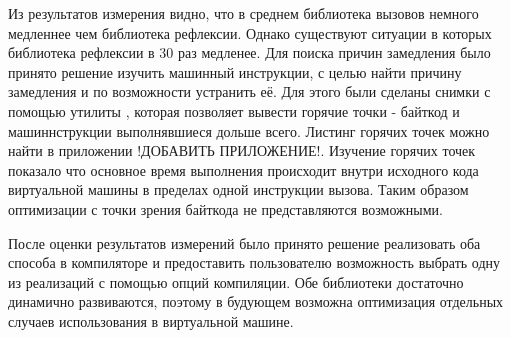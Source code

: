 Из результатов измерения видно, что в среднем библиотека вызовов немного медленнее чем библиотека рефлексии. Однако существуют ситуации в которых библиотека рефлексии в 30 раз медленее. Для поиска причин замедления было принято решение изучить машинный инструкции, с целью найти причину замедления и по возможности устранить её. Для этого были сделаны снимки с помощью утилиты , которая позволяет вывести горячие точки - байткод и машиннструкции выполнявшиеся дольше всего. Листинг горячих точек можно найти в приложении !ДОБАВИТЬ ПРИЛОЖЕНИЕ!. Изучение горячих точек показало что основное время выполнения происходит внутри исходного кода виртуальной машины в пределах одной инструкции вызова. Таким образом оптимизации с точки зрения байткода не представляются возможными.

После оценки результатов измерений было принято решение реализовать оба способа в компиляторе и предоставить пользователю возможность выбрать одну из реализаций с помощью опций компиляции. Обе библиотеки достаточно динамично развиваются, поэтому в будующем возможна оптимизация отдельных случаев использования в виртуальной машине.
